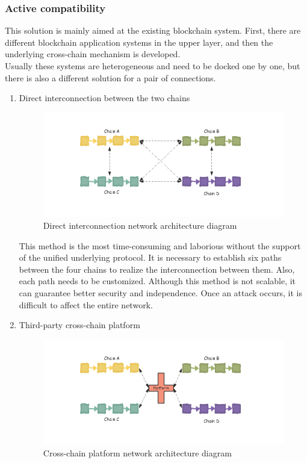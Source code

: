 \subsubsection{Active compatibility}
\noindent This solution is mainly aimed at the existing blockchain system. First, there are different blockchain application systems in the upper layer, and then the underlying cross-chain mechanism is developed.\\
\noindent Usually these systems are heterogeneous and need to be docked one by one, but there is also a different solution for a pair of connections.
\begin{enumerate}
    \item Direct interconnection between the two chains
        \begin{figure}[H]
        \includegraphics[width=1\textwidth]{./figures/direct.png}
        \centering
        \caption{Direct interconnection network architecture diagram}
        \centering
        \label{fig:direct}
        
        \end{figure}
   This method is the most time-consuming and laborious without the support of the unified underlying protocol. It is necessary to establish six paths between the four chains to realize the interconnection between them. Also, each path needs to be customized. Although this method is not scalable, it can guarantee better security and independence. Once an attack occurs, it is difficult to affect the entire network.
    \item Third-party cross-chain platform
      \begin{figure}[H]
        \includegraphics[width=1\textwidth]{./figures/platform.png}
        \centering
        \caption{Cross-chain platform network architecture diagram}
        \centering
        \label{fig:platform}
        

\end{figure}
\end{enumerate}
